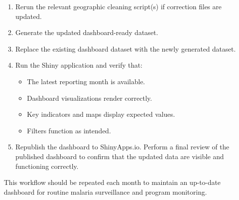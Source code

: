 \documentclass[
  letterpaper,
  DIV=11,
  numbers=noendperiod]{scrartcl}
\begin{document}
\begin{enumerate}
\begin{itemize}
    \begin{itemize}
    \item
      region\_names\_corrected.csv
    \item
      zone\_names\_corrected.csv
    \item
      woreda\_names\_corrected.csv
    \end{itemize}
  \end{itemize}
\item
  Rerun the relevant geographic cleaning script(s) if correction files
  are updated.
\item
  Generate the updated dashboard-ready dataset.
\item
  Replace the existing dashboard dataset with the newly generated
  dataset.
\item
  Run the Shiny application and verify that:

  \begin{itemize}
  \item
    The latest reporting month is available.
  \item
    Dashboard visualizations render correctly.
  \item
    Key indicators and maps display expected values.
  \item
    Filters function as intended.
  \end{itemize}
\item
  Republish the dashboard to ShinyApps.io. Perform a final review of the
  published dashboard to confirm that the updated data are visible and
  functioning correctly.
\end{enumerate}

This workflow should be repeated each month to maintain an up-to-date
dashboard for routine malaria surveillance and program monitoring.
\end{document}
